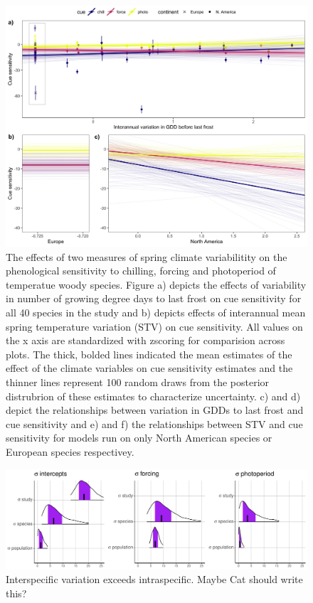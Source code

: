 \documentclass[12pt]{article}\usepackage[]{graphicx}\usepackage[]{color}
\begin{document}
\begin{figure}[h!]
    \centering
 \includegraphics[width=\textwidth]{..//..//analyses/ranges/figures/mock1.jpeg} 
    \caption{ The effects of two measures of spring climate variabilitity on the phenological sensitivity to chilling, forcing and photoperiod of temperatue woody species. Figure a) depicts the effects of variability in number of growing degree days to last frost on cue sensitivity for all 40 species in the study and b) depicts effects of interannual mean spring temperature variation (STV) on cue sensitivity. All values on the x axis are standardized with zscoring for comparision across plots. The thick, bolded lines indicated the mean estimates of the effect of the climate variables on cue sensitivity estimates and the thinner lines represent 100 random draws from the posterior distrubrion of these estimates to characterize uncertainty. c) and d) depict the relationships between variation in GDDs to last frost and cue sensitivity and e) and f) the relationships between STV and cue sensitivity for models run on only North American species or European species respectivey. }
    \label{fig:mods2}
\end{figure}


\begin{figure}[h!]
    \centering
 \includegraphics[width=\textwidth]{..//..//analyses/ranges/figures/variancepartitioning.pdf} 
    \caption{Interspecific variation exceeds intraspecific.  Maybe Cat should write this?}
    \label{fig:popy}
\end{figure}
\end{document}
